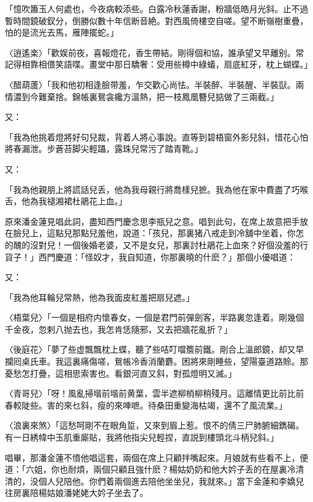 「憶吹簫玉人何處也，今夜病較添些。白露冷秋蓮香謝，粉牆低皓月光斜。止不過暫時間鏡破釵分，倒勝似數十年信断音絶。對西風倚樓空自嗟。望不断嶺樹重疊，怕的是流光去馬，雁陣擺蛇。」

〈逍遙楽〉「歡娱前夜，喜報燈花，香生帶結。剛得個和協，誰承望又早離别。常記得相靠相偎笑語喋。畫堂中那日驕奢：受用些樽中綠蟻，扇底紅牙，枕上蝴蝶。」

〈醋葫蘆〉「我和他初相逢臉带羞，乍交歡心尚怯。半裝醉、半裝醒、半裝獃。兩情濃到今難棄捨。錦帳裏鴛衾纔方溫熱，把一枝鳳凰簪兒掂做了三兩截。」

又：

「我為他挑着燈將好句兒裁，背着人將心事說。直等到碧梧窗外影兒斜，惜花心怕將春漏泄。步蒼苔脚尖輕躡，露珠兒常污了踏青靴。」

又：

「我為他親朋上將謊話兒丢，他為我母親行將喬樣兒摭。我為他在家中費盡了巧喉舌，他為我褪湘裙杜鵑花上血。」

原來潘金蓮見唱此詞，盡知西門慶念思李瓶兒之意。唱到此句，在席上故意把手放在臉兒上，這點兒那點兒羞他，說道：「孩兒，那裏猪八戒走到冷舖中坐着，你怎的醜的沒對兒！一個後婚老婆，又不是女兒，那裏討杜鵑花上血來？好個没羞的行貨子！」西門慶道：「怪奴才，我自知道，你那裏曉的什麽？」那個小優唱道：

又：

「我為他耳輪兒常熱，他為我面皮紅羞把扇兒遮。」

〈梧葉兒〉「一個是相府内懷春女，一個是君門前彈劍客，半路裏忽逢着。剛幾個千金夜，忽剌八抛去也，我怎肯恁隨邪，又去把牆花亂折？」

〈後庭花〉「夢了些虚飄飄枕上蝶，聽了些咭叮噹簷前鐵。剛合上溫郎鏡，却又早攔囘桌氏車。我這裏痛傷嗟，鴛帳冷香消蘭麝。困將來剛睡些，望陽臺道路賒。那憂愁怎打疊，這相思索害也。看銀河直又斜，對孤燈明又滅。」

〈青哥兒〉「呀！風亂掃堦前堦前黄葉，雲半遮柳梢柳稍殘月。這離情更比前比前春較陡些。害的來乜斜，瘦的來唓嗻。待桑田重變海枯竭，還不了風流業。」

〈浪裏來煞〉「這愁呵剛不在眼角踅，又來到眉上惹。恨不的倩三尸肺腑細鐫碣。有一日綉幃中玉肌重廝貼，我將他指尖兒輕捏，直説到樓頭北斗柄兒斜。」

唱畢，那潘金蓮不憤他唱這套，兩個在席上只顧拌嘴起來。月娘就有些看不上，便道：「六姐，你也耐煩，兩個只顧且強什麽？楊姑奶奶和他大妗子丢的在屋裏冷清清的，没個人兒陪他。你們着兩個進去陪他坐坐兒，我就來。」當下金蓮和李嬌兒往房裏陪楊姑娘潘姥姥大妗子坐去了。

